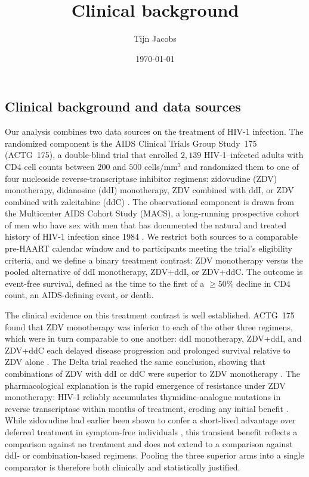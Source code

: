 \documentclass[11pt]{article}
\title{Clinical background}
\author{Tijn Jacobs}
\date{\today}
\theoremstyle{plain}
\theoremstyle{definition}
\theoremstyle{remark}
\newcommand{\1}{\mathds{1}}
\begin{document}
\maketitle

\subsection{Clinical background and data sources}

Our analysis combines two data sources on the treatment of HIV-1 infection.
The randomized component is the AIDS Clinical Trials Group Study~175
(ACTG~175), a double-blind trial that enrolled $2{,}139$ HIV-1--infected
adults with CD4 cell counts between $200$ and $500$ cells/mm$^3$ and
randomized them to one of four nucleoside reverse-transcriptase inhibitor
regimens: zidovudine (ZDV) monotherapy, didanosine (ddI) monotherapy, ZDV
combined with ddI, or ZDV combined with zalcitabine (ddC)
\citep{hammer1996}. The observational component is drawn from the
Multicenter AIDS Cohort Study (MACS), a long-running prospective cohort of
men who have sex with men that has documented the natural and treated
history of HIV-1 infection since 1984 \citep{kaslow1987}. We restrict both
sources to a comparable pre-HAART calendar window and to participants
meeting the trial's eligibility criteria, and we define a binary treatment
contrast: ZDV monotherapy versus the pooled alternative of ddI monotherapy,
ZDV+ddI, or ZDV+ddC. The outcome is event-free survival, defined as the
time to the first of a $\geq 50\%$ decline in CD4 count, an AIDS-defining
event, or death.

The clinical evidence on this treatment contrast is well established.
ACTG~175 found that ZDV monotherapy was inferior to each of the other three
regimens, which were in turn comparable to one another: ddI monotherapy,
ZDV+ddI, and ZDV+ddC each delayed disease progression and prolonged
survival relative to ZDV alone \citep{hammer1996}. The Delta trial reached
the same conclusion, showing that combinations of ZDV with ddI or ddC were
superior to ZDV monotherapy \citep{delta1996}. The pharmacological
explanation is the rapid emergence of resistance under ZDV monotherapy:
HIV-1 reliably accumulates thymidine-analogue mutations in reverse
transcriptase within months of treatment, eroding any initial benefit
\citep{larder1989}. While zidovudine had earlier been shown to confer a
short-lived advantage over deferred treatment in symptom-free individuals
\citep{concorde1994}, this transient benefit reflects a comparison against
no treatment and does not extend to a comparison against ddI- or
combination-based regimens. Pooling the three superior arms into a single
comparator is therefore both clinically and statistically justified.
\end{document}
